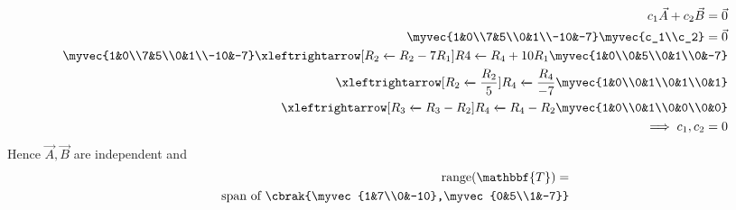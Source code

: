 \documentclass[journal,12pt,twocolumn]{IEEEtran}
\begin{document}
\begin{align}
    c_1\vec{A}+c_2\vec{B}=\vec{0}\\
    \myvec{1&0\\7&5\\0&1\\-10&-7}\myvec{c_1\\c_2}=\vec{0}\\
    \myvec{1&0\\7&5\\0&1\\-10&-7}\xleftrightarrow[R_2\xleftarrow{}R_2-7R_1]{R4\xleftarrow{}R_4+10R_1}\myvec{1&0\\0&5\\0&1\\0&-7}\\
    \xleftrightarrow[R_2\xleftarrow{}\frac{R_2}{5}]{R_4\xleftarrow{}\frac{R_4}{-7}}\myvec{1&0\\0&1\\0&1\\0&1}\\
     \xleftrightarrow[R_3\xleftarrow{}R_3-R_2]{R_4\xleftarrow{}R_4-R_2}\myvec{1&0\\0&1\\0&0\\0&0}\\
     \implies c_1,c_2=0
\end{align}
Hence $\vec{A},\vec{B}$ are independent and 
\begin{align}
    \text{range}(\mathbbf{T})=\\\text{span of }\cbrak{\myvec{1&7\\0&-10},\myvec{0&5\\1&-7}}
\end{align}
\end{document}
